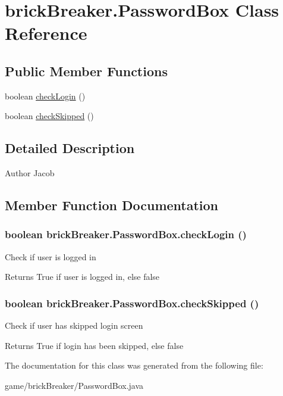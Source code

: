 \hypertarget{classbrick_breaker_1_1_password_box}{
\section{brickBreaker.PasswordBox Class Reference}
\label{classbrick_breaker_1_1_password_box}
}
\subsection*{Public Member Functions}
\begin{DoxyCompactItemize}
\item 
boolean \hyperlink{classbrick_breaker_1_1_password_box_a286ea1727bf1fbaeba6ba928d0779526}{checkLogin} ()
\item 
boolean \hyperlink{classbrick_breaker_1_1_password_box_a88b47539fc6a2f7b7e51a8258d5821de}{checkSkipped} ()
\end{DoxyCompactItemize}


\subsection{Detailed Description}
\begin{DoxyAuthor}{Author}
Jacob 
\end{DoxyAuthor}


\subsection{Member Function Documentation}
\hypertarget{classbrick_breaker_1_1_password_box_a286ea1727bf1fbaeba6ba928d0779526}{
\subsubsection[{checkLogin}]{\setlength{\rightskip}{0pt plus 5cm}boolean brickBreaker.PasswordBox.checkLogin ()}}
\label{classbrick_breaker_1_1_password_box_a286ea1727bf1fbaeba6ba928d0779526}
Check if user is logged in

\begin{DoxyReturn}{Returns}
True if user is logged in, else false 
\end{DoxyReturn}
\hypertarget{classbrick_breaker_1_1_password_box_a88b47539fc6a2f7b7e51a8258d5821de}{
\subsubsection[{checkSkipped}]{\setlength{\rightskip}{0pt plus 5cm}boolean brickBreaker.PasswordBox.checkSkipped ()}}
\label{classbrick_breaker_1_1_password_box_a88b47539fc6a2f7b7e51a8258d5821de}
Check if user has skipped login screen

\begin{DoxyReturn}{Returns}
True if login has been skipped, else false 
\end{DoxyReturn}


The documentation for this class was generated from the following file:\begin{DoxyCompactItemize}
\item 
game/brickBreaker/PasswordBox.java\end{DoxyCompactItemize}
